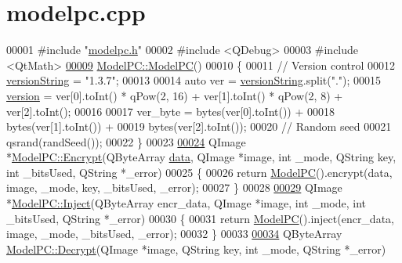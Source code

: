 \hypertarget{modelpc_8cpp_source}{\section{modelpc.\-cpp}
}

\begin{DoxyCode}
00001 \textcolor{preprocessor}{#include "\hyperlink{modelpc_8h}{modelpc.h}"}
00002 \textcolor{preprocessor}{#include <QDebug>}
00003 \textcolor{preprocessor}{#include <QtMath>}
\hypertarget{modelpc_8cpp_source_l00009}{}\hyperlink{class_model_p_c_ae12ebe65ec973c02a0de4850a7c1e31c}{00009} \hyperlink{class_model_p_c_ae12ebe65ec973c02a0de4850a7c1e31c}{ModelPC::ModelPC}()
00010 \{
00011     \textcolor{comment}{// Version control}
00012     \hyperlink{class_model_p_c_a5f426725ccf7eefd3c77ea8c720264c9}{versionString} = \textcolor{stringliteral}{"1.3.7"};
00013 
00014     \textcolor{keyword}{auto} ver = \hyperlink{class_model_p_c_a5f426725ccf7eefd3c77ea8c720264c9}{versionString}.split(\textcolor{stringliteral}{"."});
00015     \hyperlink{class_model_p_c_a5af48ab89e19be42a94c34ba00249401}{version} = ver[0].toInt() * qPow(2, 16) + ver[1].toInt() * qPow(2, 8) + ver[2].toInt();
00016 
00017     ver\_byte = bytes(ver[0].toInt()) +
00018             bytes(ver[1].toInt()) +
00019             bytes(ver[2].toInt());
00020     \textcolor{comment}{// Random seed}
00021     qsrand(randSeed());
00022 \}
00023 
\hypertarget{modelpc_8cpp_source_l00024}{}\hyperlink{class_model_p_c_a271cf9285e32df58ffbfc918e6482bbd}{00024} QImage *\hyperlink{class_model_p_c_a271cf9285e32df58ffbfc918e6482bbd}{ModelPC::Encrypt}(QByteArray \hyperlink{namespace_errors_dict_setup_adf4c30d205d29df7343e26f7c62b0685}{data}, QImage *image, \textcolor{keywordtype}{int} \_mode, QString key, \textcolor{keywordtype}{int} 
      \_bitsUsed, QString *\_error)
00025 \{
00026     \textcolor{keywordflow}{return} \hyperlink{class_model_p_c_ae12ebe65ec973c02a0de4850a7c1e31c}{ModelPC}().encrypt(data, image, \_mode, key, \_bitsUsed, \_error);
00027 \}
00028 
\hypertarget{modelpc_8cpp_source_l00029}{}\hyperlink{class_model_p_c_ac17e68e6aab134621b0d151d74acdc82}{00029} QImage *\hyperlink{class_model_p_c_ac17e68e6aab134621b0d151d74acdc82}{ModelPC::Inject}(QByteArray encr\_data, QImage *image, \textcolor{keywordtype}{int} \_mode, \textcolor{keywordtype}{int} \_bitsUsed, 
      QString *\_error)
00030 \{
00031     \textcolor{keywordflow}{return} \hyperlink{class_model_p_c_ae12ebe65ec973c02a0de4850a7c1e31c}{ModelPC}().inject(encr\_data, image, \_mode, \_bitsUsed, \_error);
00032 \}
00033 
\hypertarget{modelpc_8cpp_source_l00034}{}\hyperlink{class_model_p_c_a902abaea4f07995b48c0f2fea6eceb7c}{00034} QByteArray \hyperlink{class_model_p_c_a902abaea4f07995b48c0f2fea6eceb7c}{ModelPC::Decrypt}(QImage *image, QString key, \textcolor{keywordtype}{int} \_mode, QString *\_error)

\end{DoxyCode}

